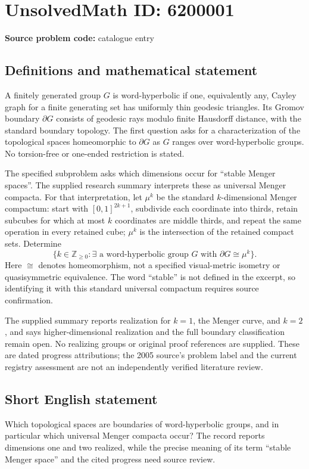 \documentclass[11pt]{article}
\begin{document}
\section*{UnsolvedMath ID: 6200001}
\textbf{Source problem code:} catalogue entry
\subsection{Definitions and mathematical statement}
A finitely generated group \(G\) is word-hyperbolic if one, equivalently any, Cayley graph for a finite generating set has uniformly thin geodesic triangles. Its Gromov boundary \(\partial G\) consists of geodesic rays modulo finite Hausdorff distance, with the standard boundary topology. The first question asks for a characterization of the topological spaces homeomorphic to \(\partial G\) as \(G\) ranges over word-hyperbolic groups. No torsion-free or one-ended restriction is stated.

The specified subproblem asks which dimensions occur for ``stable Menger spaces''. The supplied research summary interprets these as universal Menger compacta. For that interpretation, let \(\mu^k\) be the standard \(k\)-dimensional Menger compactum: start with \([0,1]^{2k+1}\), subdivide each coordinate into thirds, retain subcubes for which at most \(k\) coordinates are middle thirds, and repeat the same operation in every retained cube; \(\mu^k\) is the intersection of the retained compact sets. Determine
\[
 \{k\in\mathbb Z_{\ge0}:\exists\text{ a word-hyperbolic group }G
 \text{ with }\partial G\cong\mu^k\}.
\]
Here \(\cong\) denotes homeomorphism, not a specified visual-metric isometry or quasisymmetric equivalence. The word ``stable'' is not defined in the excerpt, so identifying it with this standard universal compactum requires source confirmation.

The supplied summary reports realization for \(k=1\), the Menger curve, and \(k=2\), and says higher-dimensional realization and the full boundary classification remain open. No realizing groups or original proof references are supplied. These are dated progress attributions; the 2005 source's problem label and the current registry assessment are not an independently verified literature review.
\subsection{Short English statement}
Which topological spaces are boundaries of word-hyperbolic groups, and in particular which universal Menger compacta occur? The record reports dimensions one and two realized, while the precise meaning of its term ``stable Menger space'' and the cited progress need source review.
\end{document}
